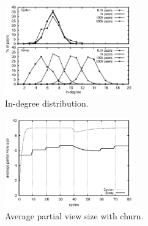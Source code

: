 \begin{figure}
  \centering
  \includegraphics[width=0.49\textwidth]{img/histo.eps}
  \caption{\label{fig:histo}In-degree distribution.}
\end{figure}



\begin{figure}
  \centering
  \includegraphics[width=0.49\textwidth]{img/avgpv.eps}
  \caption{\label{fig:churnB}Average partial view size with churn.}
\end{figure}


\ \\

